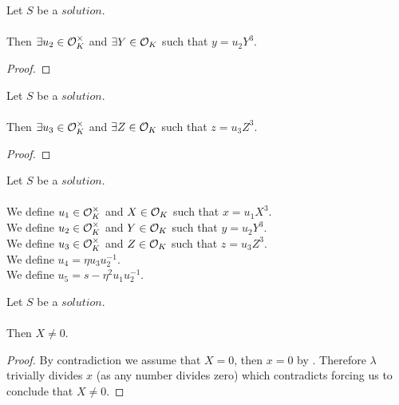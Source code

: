 \begin{lemma}
    \label{lmm:y_eq_unit_mul_cube}
    \leanok
    Let $S$ be a $solution$.\\\\
    Then $\exists u_2 \in \mathcal{O}^\times_K$ and $\exists Y \in \mathcal{O}_K$
    such that $y = u_2 Y^3$.
\end{lemma}
\begin{proof}
    \leanok
\end{proof}

\begin{lemma}
    \label{lmm:z_eq_unit_mul_cube}
    \leanok
    Let $S$ be a $solution$.\\\\
    Then $\exists u_3 \in \mathcal{O}^\times_K$ and $\exists Z \in \mathcal{O}_K$
    such that $z = u_3  Z^3$.
\end{lemma}
\begin{proof}
    \leanok
\end{proof}

\begin{definition}[$u_1,u_2,u_3,u_4,u_5,X,Y,Z$]
    \label{def:Solution_u1_u2_u3_u4_u5_X_Y_Z}
    \leanok
    Let $S$ be a $solution$.\\\\
    We define $u_1 \in \mathcal{O}^\times_K$ and $X \in \mathcal{O}_K$
    such that $x = u_1 X^3$.\\
    We define $u_2 \in \mathcal{O}^\times_K$ and $Y \in \mathcal{O}_K$
    such that $y = u_2 Y^3$.\\
    We define $u_3 \in \mathcal{O}^\times_K$ and $Z \in \mathcal{O}_K$
    such that $z = u_3 Z^3$.\\
    We define $u_4 = \eta u_3 u_2^{-1}$.\\
    We define $u_5 = s-\eta^2 u_1 u_2^{-1}$.\\
\end{definition}

\begin{lemma}
    \label{lmm:X_ne_zero}
    \leanok
    Let $S$ be a $solution$.\\\\
    Then $X \neq 0$.
\end{lemma}
\begin{proof}
    \leanok
    By contradiction we assume that $X = 0$, then $x = 0$ by .
    Therefore $\lambda$ trivially divides $x$ (as any number divides zero) which contradicts
     forcing us to conclude that $X \neq 0$.
\end{proof}

